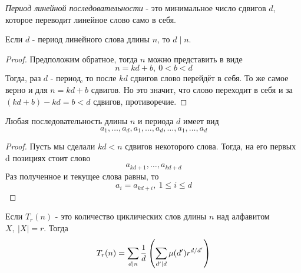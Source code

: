 \begin{definition}
	\textit{Период линейной последовательности} - это минимальное число сдвигов $d$, которое переводит линейное слово само в себя.
\end{definition}

\begin{lemma}
	Если $d$ - период линейного слова длины $n$, то $d \mid n$.
\end{lemma}

\begin{proof}
	Предположим обратное, тогда $n$ можно представить в виде
	\[
		n = kd + b,\ 0 < b < d
	\]
	Тогда, раз $d$ - период, то после $kd$ сдвигов слово перейдёт в себя. То же самое верно и для $n = kd + b$ сдвигов. Но это значит, что слово переходит в себя и за $(kd + b) - kd = b < d$ сдвигов, противоречие.
\end{proof}

\begin{lemma}
	Любая последовательность длины $n$ и периода $d$ имеет вид
	\[
		a_1, \ldots, a_d, a_1, \ldots, a_d, \ldots, a_1, \ldots, a_d
	\]
\end{lemma}

\begin{proof}
	Пусть мы сделали $kd < n$ сдвигов некоторого слова. Тогда, на его первых d позициях стоит слово
	\[
		a_{kd + 1}, \ldots, a_{kd + d}
	\]
	Раз полученное и текущее слова равны, то
	\[
		a_i = a_{kd + i},\ 1 \le i \le d
	\]
\end{proof}

\begin{theorem}
	Если $T_r(n)$ - это количество циклических слов длины $n$ над алфавитом $X,\ |X| = r$. Тогда
	\[
		T_r(n) = \sum\limits_{d \mid n} \frac{1}{d} \left(\sum\limits_{d' \mid d} \mu(d') r^{d / d'}\right)
	\]
\end{theorem}